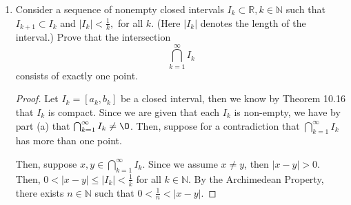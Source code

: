 \documentclass[11pt]{article}
\newcommand{\bbN}{\mathbb{N}}
\newcommand{\bbR}{\mathbb{R}}
\renewcommand{\emptyset}{\O}
\renewcommand{\_}[1]{\underline{ #1 }}
\theoremstyle{definition}
\numberwithin{equation}{subsection}
\begin{document}
\begin{enumerate}
\begin{enumerate}
\begin{proof}

Suppose for sake of contradiction that $\bigcap_{i=1}^\infty X_i = \emptyset$. 

We see that for all $x \in X_1$, there exists $X_j$ such that $x \notin X_j$, then $x \in X_1 \setminus X_j$, hence $X_1 \subset \bigcup_{i=2}^\infty (X_1 \setminus X_j)$. Moreover, every $X_j$ is closed (because it is compact), hence $X_1 \setminus X_j = X_1 \cap \bbR \setminus X_j$ where $\bbR \setminus X_j$ is open, hence $X_1 \setminus X_j$ is open in $X_1$. Thus, $\{X_1 \setminus X_j\}_{j \in (1,\infty)}$ is an open cover of $X_1$. For simplicity of notation, we write this as $\{{X_j}^c\}_{j \in (1, \infty)}$ (the $c$ denotes complement with respect to $X_1$). 

Since $X_1$ is compact, there exists a finite subcover $\cG \subset \{{X_j}^c\}_{j \in (1, \infty)}$. Hence, we can write $\cG = \{{X_{j_1}}^c, {X_{j_2}}^c, \dots, {X_{j_n}}^c\}$. 

Since the sets are nested, we see that $X_1 \setminus X_k \subset X_1 \setminus X_{k+1}$ for all $k$. Hence, let $m = \max \{j_1, j_2, \dots, j_n\}$. Then, for all $G \in \cG$, we have that $G \subset {X_{m}}^c$.

Then, $X_1 \subset \bigcup_{G \in \cG} G \subset {X_{m}}^c$. Thus, $X_1 \subset X_1 \setminus X_m$, which implies that $X_m = \emptyset$. This contradicts the assumption that all $X_i$ are non-empty.

This completes the proof.


\renewcommand\qedsymbol{QED}
\end{proof}



\item Consider a sequence of nonempty closed intervals $I_k \subset \mathbb{R}, k\in \mathbb{N}$ such that 
$I_{k+1} \subset I_k$ and $|I_k| <\frac{1}{k},$ for all $k.$ (Here $|I_k|$ denotes the length of the interval.) Prove that 
the intersection $$\bigcap_{k=1}^\infty I_k$$ consists of exactly one point. 


\begin{proof}
Let $I_k = [a_k,b_k]$ be a closed interval, then we know by Theorem 10.16 that $I_k$ is compact. Since we are given that each $I_k$ is non-empty, we have by part (a) that $\bigcap_{k=1}^\infty I_k \neq \emptyset$. Then, suppose for a contradiction that $\bigcap_{k=1}^\infty I_k$ has more than one point.

Then, suppose $x,y \in \bigcap_{k=1}^\infty I_k$. Since we assume $x\neq y$, then $|x-y|>0$. Then, $0<|x-y|\leq |I_k| < \frac{1}{k}$ for all $k \in \bbN$. By the Archimedean Property, there exists $n \in \bbN$ such that $0<\frac{1}{n}< |x-y|$.


\end{proof}
\end{enumerate}
\end{enumerate}
\end{document}
